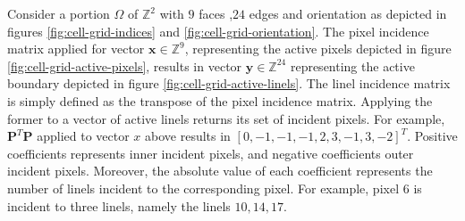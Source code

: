 \begin{example}
	Consider a portion $\Omega$ of $\mathbb{Z}^2$ with $9$ faces ,$24$ edges and orientation as depicted in figures \ref{fig:cell-grid-indices} and \ref{fig:cell-grid-orientation}. 	
	The pixel incidence matrix applied for vector $\mathbf{x} \in \mathbb{Z}^9$, representing the active pixels depicted in figure \ref{fig:cell-grid-active-pixels}, results in vector $\mathbf{y} \in \mathbb{Z}^{24}$ representing the active boundary depicted in figure \ref{fig:cell-grid-active-linels}.
	The linel incidence matrix is simply defined as the transpose of the pixel incidence matrix. Applying the former to a vector of active linels returns its set of incident pixels. For example, $\mathbf{P}^{T}\mathbf{P}$ applied to vector $x$ above results in $[0,-1,-1,-1,2,3,-1,3,-2]^T$. Positive coefficients represents inner incident pixels, and negative coefficients outer incident pixels. Moreover, the absolute value of each coefficient represents the number of linels incident to the corresponding pixel. For example, pixel $6$ is incident to three linels, namely the linels $10,14,17$.

\end{example}

